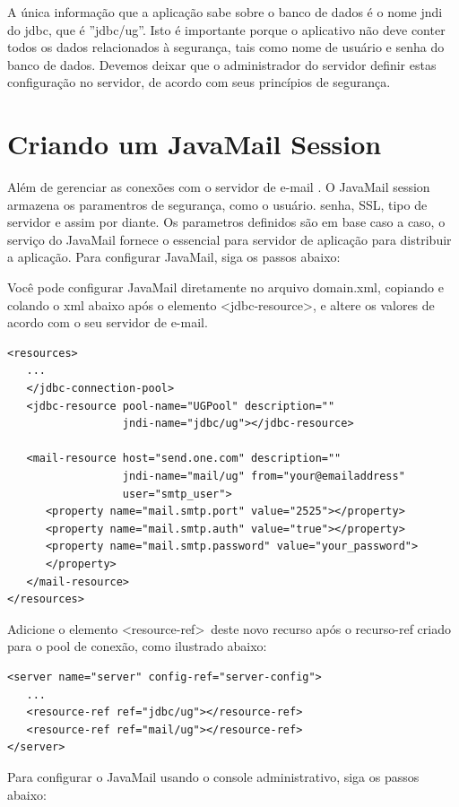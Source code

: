 \documentclass[envcountsame,envcountchap]{svmono}
\begin{document}
A única informação que a aplicação sabe sobre o banco de dados é o nome jndi do jdbc, que é ''jdbc/ug''. Isto é importante porque o aplicativo não deve conter todos os dados relacionados à segurança, tais como nome de usuário e senha do banco de dados. Devemos deixar que o administrador do servidor definir estas configuração no servidor, de acordo com seus princípios de segurança.

\section{Criando um JavaMail Session}

Além de gerenciar as conexões com o servidor de e-mail . O JavaMail session armazena os paramentros de segurança, como o usuário. senha, SSL, tipo de servidor e assim por diante. Os parametros definidos são em base caso a caso,  o serviço do JavaMail fornece o essencial para servidor de aplicação para distribuir a aplicação. Para configurar JavaMail, siga os passos abaixo:

Você pode configurar JavaMail diretamente no arquivo domain.xml, copiando e colando o xml abaixo após o elemento \textless jdbc-resource\textgreater, e altere os valores de acordo com o seu servidor de e-mail.

\begin{verbatim}
<resources>
   ...
   </jdbc-connection-pool>
   <jdbc-resource pool-name="UGPool" description=""
                  jndi-name="jdbc/ug"></jdbc-resource>

   <mail-resource host="send.one.com" description=""
                  jndi-name="mail/ug" from="your@emailaddress"
                  user="smtp_user">
      <property name="mail.smtp.port" value="2525"></property>
      <property name="mail.smtp.auth" value="true"></property>
      <property name="mail.smtp.password" value="your_password">
      </property>
   </mail-resource>
</resources>
\end{verbatim}

Adicione o elemento \textless resource-ref\textgreater \ deste novo recurso após o recurso-ref criado para o pool de conexão, como ilustrado abaixo:

\begin{verbatim}
<server name="server" config-ref="server-config">
   ...
   <resource-ref ref="jdbc/ug"></resource-ref>
   <resource-ref ref="mail/ug"></resource-ref>
</server>
\end{verbatim}

Para configurar o JavaMail usando o console administrativo, siga os passos abaixo:
\end{document}
